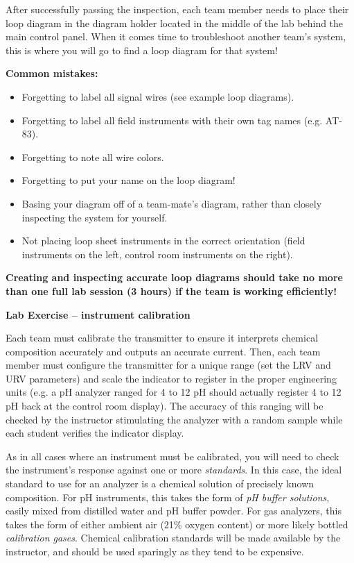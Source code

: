 After successfully passing the inspection, each team member needs to place their loop diagram in the diagram holder located in the middle of the lab behind the main control panel.  When it comes time to troubleshoot another team's system, this is where you will go to find a loop diagram for that system!

\vskip 10pt

{\bf Common mistakes:}

\begin{itemize}
\item{} Forgetting to label all signal wires (see example loop diagrams).
\item{} Forgetting to label all field instruments with their own tag names (e.g. AT-83).
\item{} Forgetting to note all wire colors.
\item{} Forgetting to put your name on the loop diagram!
\item{} Basing your diagram off of a team-mate's diagram, rather than closely inspecting the system for yourself.
\item{} Not placing loop sheet instruments in the correct orientation (field instruments on the left, control room instruments on the right).
\end{itemize}

\vskip 10pt

{\bf Creating and inspecting accurate loop diagrams should take no more than one full lab session (3 hours) if the team is working efficiently!}





\vfil \eject

\noindent
{\bf Lab Exercise -- instrument calibration}

\vskip 5pt

Each team must calibrate the transmitter to ensure it interprets chemical composition accurately and outputs an accurate current.  Then, each team member must configure the transmitter for a unique range (set the LRV and URV parameters) and scale the indicator to register in the proper engineering units (e.g. a pH analyzer ranged for 4 to 12 pH should actually register 4 to 12 pH back at the control room display).  The accuracy of this ranging will be checked by the instructor stimulating the analyzer with a random sample while each student verifies the indicator display.

As in all cases where an instrument must be calibrated, you will need to check the instrument's response against one or more {\it standards}.  In this case, the ideal standard to use for an analyzer is a chemical solution of precisely known composition.  For pH instruments, this takes the form of {\it pH buffer solutions}, easily mixed from distilled water and pH buffer powder.  For gas analyzers, this takes the form of either ambient air (21\% oxygen content) or more likely bottled {\it calibration gases}.  Chemical calibration standards will be made available by the instructor, and should be used sparingly as they tend to be expensive.

